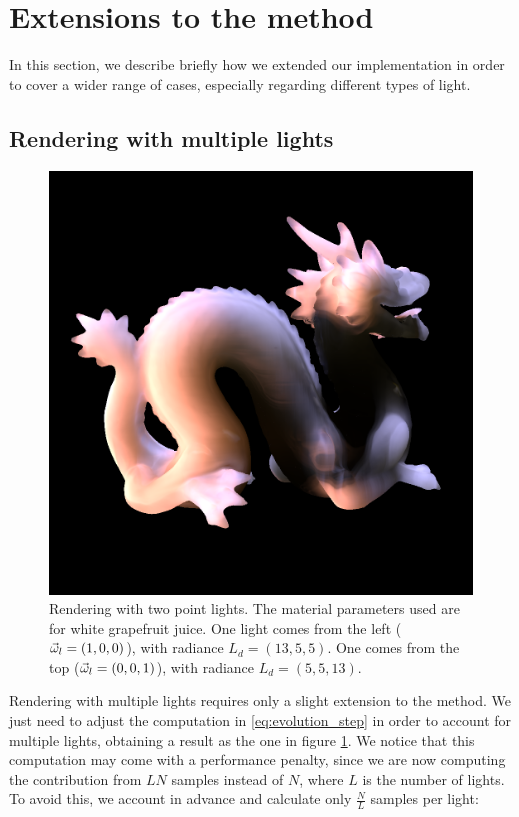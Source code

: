 \section{Extensions to the method}

In this section, we describe briefly how we extended our implementation in order to cover a wider range of cases, especially regarding different types of light.

\subsection{Rendering with multiple lights}

\begin{figure}
\centering
\includegraphics[width=0.9 \linewidth]{images/results/multiple.png}
\caption{Rendering with two point lights. The material parameters used are for white grapefruit juice. One light comes from the left ($\vec{\omega}_l = (1,0,0)$), with radiance $L_d = (13,5,5)$. One comes from the top ($\vec{\omega}_l = (0,0,1)$), with radiance $L_d = (5,5,13)$.}
\label{fig:multilight}
\end{figure}

Rendering with multiple lights requires only a slight extension to the method. We just need to adjust the computation in \ref{eq:evolution_step} in order to account for multiple lights, obtaining a result as the one in figure \ref{fig:multilight}. We notice that this computation may come with a performance penalty, since we are now computing the contribution from $L N$ samples instead of $N$, where $L$ is the number of lights. To avoid this, we account in advance and calculate only $\frac{N}{L}$ samples per light:

